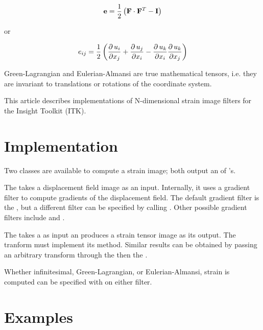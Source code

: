 \documentclass{InsightArticle}
\begin{document}
\begin{equation}
\mathbf{e} = {1 \over 2} \left( \mathbf{F} \cdot \mathbf{F}^T - \mathbf{I} \right)
\end{equation}

or

\begin{equation}
e_{ij} = {1 \over 2} \left( {\partial \, u_i \over \partial x_j} + {\partial \, u_j \over \partial x_i} -
                         {\partial \, u_k \over \partial x_i} {\partial \, u_k \over \partial x_j} \right)
\end{equation}

Green-Lagrangian and Eulerian-Almansi are true mathematical tensors, i.e.
they are invariant to translations or rotations of the coordinate system.

This article describes implementations of N-dimensional strain image filters
for the Insight Toolkit (ITK).

\section{Implementation}

Two classes are available to compute a strain image; both output an
 of 's.

The  takes a displacement field image as an input.
Internally, it uses a gradient filter to compute gradients of the displacement
field. The default gradient filter is the , but a
different filter can be specified by calling .
Other possible gradient filters include
 and
.

The  takes a  as input an
produces a strain tensor image as its output. The tranform must implement its
 method. Similar results can be
obtained by passing an arbitrary transform through the
 then the
.

Whether infinitesimal, Green-Lagrangian, or Eulerian-Almansi, strain is
computed can be specified with  on either filter.


\section{Examples}
\end{document}
